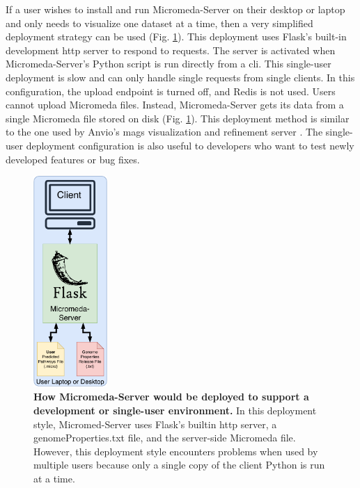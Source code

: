If a user wishes to install and run Micromeda-Server on their desktop or laptop 
and only needs to visualize one dataset at a time, then a very simplified 
deployment strategy can be used (Fig. \ref{fig:micromeda-small-deploy}). This 
deployment uses Flask's built-in development \gls{http} server to respond to 
requests. The server is activated when Micromeda-Server's Python script is run 
directly from a \gls{cli}. This single-user deployment is slow and can only 
handle single requests from single clients. In this configuration, the upload 
endpoint is turned off, and Redis is not used. Users cannot upload Micromeda 
files. Instead, Micromeda-Server gets its data from a single Micromeda file 
stored on disk (Fig. \ref{fig:micromeda-small-deploy}). This deployment method 
is similar to the one used by Anvio's \gls{mags} visualization and refinement 
server \cite{eren2015anvi}. The single-user deployment configuration is also 
useful to developers who want to test newly developed features or bug fixes.

\begin{figure}[!ht]
  \centering
	\includegraphics[width=0.25\textwidth]{media/micromeda-simple-deployment.pdf}
	 \caption[How Micromeda-Server would be deployed to support a development or 
single-user environment.]{\textbf{How Micromeda-Server would be deployed to 
support a development or single-user environment.} In this deployment style, 
Micromed-Server uses Flask's builtin \gls{http} server, a genomeProperties.txt 
file, and the server-side Micromeda file. However, this deployment style 
encounters problems when used by multiple users because only a single copy of 
the client Python is run at a time.}
	 \label{fig:micromeda-small-deploy}
\end{figure}

